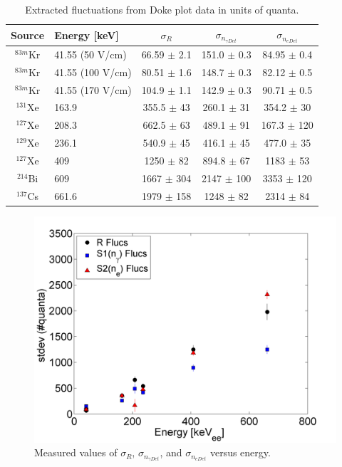\documentclass[a4paper,12pt]{article}
\begin{document}
{\begin{center}
\begin{table}[H]
\begin{tabular}{ | c | p{40mm} | c | c | c | }
\hline
Source & Energy [keV] & $\sigma_{R}$ & $\sigma_{n_{\gamma Det}}$ & $\sigma_{n_{e Det}}$ \\ \hline
$^{83m}$Kr & 41.55 (50 V/cm) & 66.59 $\pm$ 2.1 & 151.0 $\pm$ 0.3 & 84.95 $\pm$ 0.4\\  \hline
$^{83m}$Kr & 41.55 (100 V/cm) & 80.51 $\pm$ 1.6 & 148.7 $\pm$ 0.3 & 82.12 $\pm$ 0.5\\  \hline
$^{83m}$Kr & 41.55 (170 V/cm) & 104.9 $\pm$ 1.1 & 142.9 $\pm$ 0.3 & 90.71 $\pm$ 0.5\\  \hline
$^{131}$Xe & 163.9 & 355.5 $\pm$ 43 & 260.1 $\pm$ 31 & 354.2 $\pm$ 30\\  \hline
$^{127}$Xe & 208.3 & 662.5 $\pm$ 63 & 489.1 $\pm$ 91 & 167.3 $\pm$ 120\\  \hline
$^{129}$Xe & 236.1 & 540.9 $\pm$ 45 & 416.1 $\pm$ 45 & 477.0 $\pm$ 35\\  \hline
$^{127}$Xe & 409 & 1250  $\pm$ 82 & 894.8 $\pm$ 67 & 1183 $\pm$ 53\\  \hline
$^{214}$Bi & 609 & 1667 $\pm$ 304 & 2147 $\pm$ 100 & 3353 $\pm$ 120\\  \hline
$^{137}$Cs & 661.6 & 1979 $\pm$ 158 & 1248 $\pm$ 82 & 2314 $\pm$ 84\\ 
\hline
\end{tabular}
\caption{Extracted fluctuations from Doke plot data in units of quanta.}
\label{SigR}
\end{table}
\end{center}


\begin{figure}[H]
\centering
\includegraphics[scale=0.5]{EnergyFluctuations.png}
\caption{Measured values of $\sigma_{R}$, $\sigma_{n_{\gamma Det}}$, and $\sigma_{n_{e Det}}$ versus energy.}
\label{EnergyFluc}
\end{figure}

}
\end{document}
